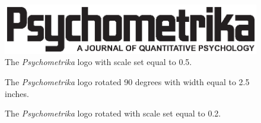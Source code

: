 \documentclass[titlepage,12pt]{article}
\begin{document}
\figskip

\begin{figure}[hp]
\begin{center}
\includegraphics[scale=.5]{p-logo.eps}
\caption{The \textit{Psychometrika} logo with scale set equal to
0.5.} \label{scale}
\end{center}
\end{figure}



\begin{figure}[hp]
\begin{center}
\caption{The \textit{Psychometrika} logo rotated 90 degrees with
width equal to 2.5 inches.} \label{rotate}
\end{center}
\end{figure}

\figskip

\begin{figure}[hp]
\begin{center}
\caption{The \textit{Psychometrika} logo rotated with scale set
equal to 0.2.} \label{scale.rotate}
\end{center}
\end{figure}


\begin{figure}[t]
\begin{center}
\end{center}
\end{figure}
\end{document}
